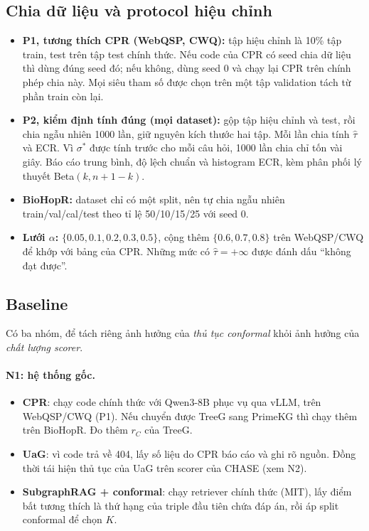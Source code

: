 \documentclass[11pt,a4paper]{article}
\theoremstyle{remark}
\newcommand{\tauhat}{\hat{\tau}}
\newcommand{\method}{\textsc{CHASE}}
\begin{document}
\subsection{Chia dữ liệu và protocol hiệu chỉnh}
\begin{itemize}[nosep]
  \item \textbf{P1, tương thích CPR (WebQSP, CWQ):} tập hiệu chỉnh là 10\% tập train, test trên tập test chính thức. Nếu code của CPR có seed chia dữ liệu thì dùng đúng seed đó; nếu không, dùng seed 0 và chạy lại CPR trên chính phép chia này. Mọi siêu tham số được chọn trên một tập validation tách từ phần train còn lại.
  \item \textbf{P2, kiểm định tính đúng (mọi dataset):} gộp tập hiệu chỉnh và test, rồi chia ngẫu nhiên 1000 lần, giữ nguyên kích thước hai tập. Mỗi lần chia tính $\tauhat$ và ECR. Vì $\sigma^*$ được tính trước cho mỗi câu hỏi, 1000 lần chia chỉ tốn vài giây. Báo cáo trung bình, độ lệch chuẩn và histogram ECR, kèm phân phối lý thuyết Beta$(k,n+1-k)$.
  \item \textbf{BioHopR:} dataset chỉ có một split, nên tự chia ngẫu nhiên train/val/cal/test theo tỉ lệ 50/10/15/25 với seed 0.  \item \textbf{Lưới $\alpha$:} $\{0.05,0.1,0.2,0.3,0.5\}$, cộng thêm $\{0.6,0.7,0.8\}$ trên WebQSP/CWQ để khớp với bảng của CPR. Những mức có $\tauhat=+\infty$ được đánh dấu ``không đạt được''.
\end{itemize}

\subsection{Baseline}
Có ba nhóm, để tách riêng ảnh hưởng của \emph{thủ tục conformal} khỏi ảnh hưởng của \emph{chất lượng scorer}.

\paragraph{N1: hệ thống gốc.}
\begin{itemize}[nosep]
  \item \textbf{CPR}: chạy code chính thức với Qwen3-8B phục vụ qua vLLM, trên WebQSP/CWQ (P1). Nếu chuyển được TreeG sang PrimeKG thì chạy thêm trên BioHopR. Đo thêm $r_C$ của TreeG.
  \item \textbf{UaG}: vì code trả về 404, lấy số liệu do CPR báo cáo và ghi rõ nguồn. Đồng thời tái hiện thủ tục của UaG trên scorer của \method{} (xem N2).
  \item \textbf{SubgraphRAG + conformal}: chạy retriever chính thức (MIT), lấy điểm bất tương thích là thứ hạng của triple đầu tiên chứa đáp án, rồi áp split conformal để chọn $K$.
\end{itemize}
\end{document}

